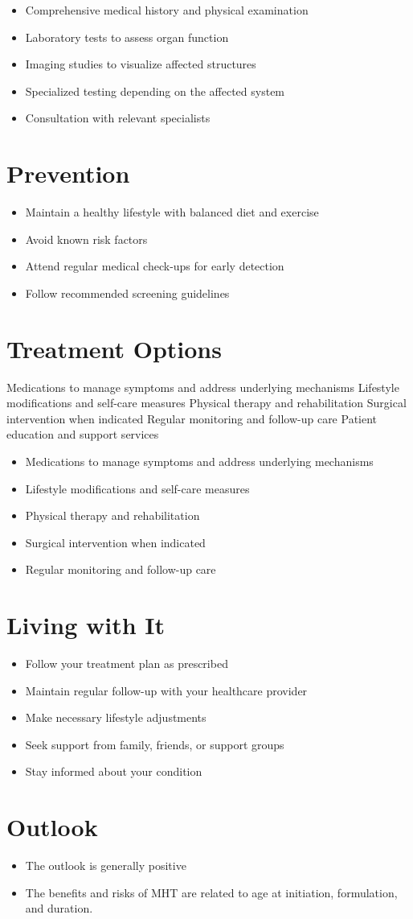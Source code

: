 \begin{itemize}[noitemsep]
  \item Comprehensive medical history and physical examination
  \item Laboratory tests to assess organ function
  \item Imaging studies to visualize affected structures
  \item Specialized testing depending on the affected system
  \item Consultation with relevant specialists
\end{itemize}
\section{Prevention}
\begin{itemize}[noitemsep]
  \item Maintain a healthy lifestyle with balanced diet and exercise
  \item Avoid known risk factors
  \item Attend regular medical check-ups for early detection
  \item Follow recommended screening guidelines
\end{itemize}
\section{Treatment Options}
Medications to manage symptoms and address underlying mechanisms Lifestyle modifications and self-care measures Physical therapy and rehabilitation Surgical intervention when indicated Regular monitoring and follow-up care Patient education and support services

\begin{itemize}[noitemsep]
  \item Medications to manage symptoms and address underlying mechanisms
  \item Lifestyle modifications and self-care measures
  \item Physical therapy and rehabilitation
  \item Surgical intervention when indicated
  \item Regular monitoring and follow-up care
\end{itemize}
\section{Living with It}
\begin{itemize}[noitemsep]
  \item Follow your treatment plan as prescribed
  \item Maintain regular follow-up with your healthcare provider
  \item Make necessary lifestyle adjustments
  \item Seek support from family, friends, or support groups
  \item Stay informed about your condition
\end{itemize}
\section{Outlook}
\begin{itemize}[noitemsep]
  \item The outlook is generally positive
  \item The benefits and risks of MHT are related to age at initiation, formulation, and duration.
\end{itemize}

